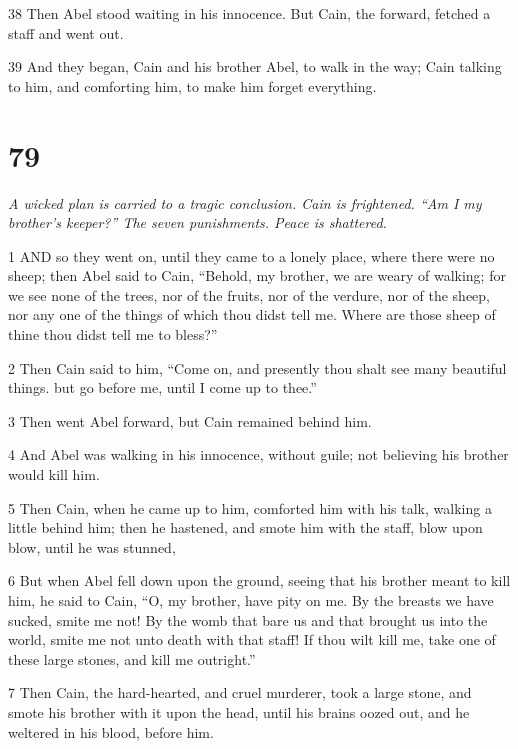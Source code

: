 \par 38 Then Abel stood waiting in his innocence. But Cain, the forward, fetched a staff and went out.

\par 39 And they began, Cain and his brother Abel, to walk in the way; Cain talking to him, and comforting him, to make him forget everything.

\chapter{79}

\par \textit{A wicked plan is carried to a tragic conclusion. Cain is frightened. “Am I my brother's keeper?” The seven punishments. Peace is shattered.}

\par 1 AND so they went on, until they came to a lonely place, where there were no sheep; then Abel said to Cain, “Behold, my brother, we are weary of walking; for we see none of the trees, nor of the fruits, nor of the verdure, nor of the sheep, nor any one of the things of which thou didst tell me. Where are those sheep of thine thou didst tell me to bless?”

\par 2 Then Cain said to him, “Come on, and presently thou shalt see many beautiful things. but go before me, until I come up to thee.”

\par 3 Then went Abel forward, but Cain remained behind him.

\par 4 And Abel was walking in his innocence, without guile; not believing his brother would kill him.

\par 5 Then Cain, when he came up to him, comforted him with his talk, walking a little behind him; then he hastened, and smote him with the staff, blow upon blow, until he was stunned,

\par 6 But when Abel fell down upon the ground, seeing that his brother meant to kill him, he said to Cain, “O, my brother, have pity on me. By the breasts we have sucked, smite me not! By the womb that bare us and that brought us into the world, smite me not unto death with that staff! If thou wilt kill me, take one of these large stones, and kill me outright.”

\par 7 Then Cain, the hard-hearted, and cruel murderer, took a large stone, and smote his brother with it upon the head, until his brains oozed out, and he weltered in his blood, before him.

